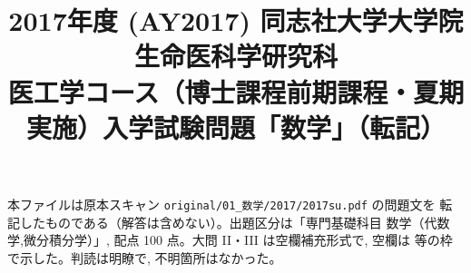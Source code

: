 \documentclass[11pt,a4paper]{article}
\title{2017年度 (AY2017) 同志社大学大学院 生命医科学研究科\\
医工学コース（博士課程前期課程・夏期実施）入学試験問題「数学」（転記）}
\author{}
\date{}
\begin{document}
\maketitle
\vspace{-3em}

\begin{rem}
本ファイルは原本スキャン \texttt{original/01\_数学/2017/2017su.pdf} の問題文を
転記したものである（解答は含めない）。出題区分は「専門基礎科目 数学（代数学,微分積分学）」,
配点 100 点。大問 II・III は空欄補充形式で, 空欄は  等の枠で示した。判読は明瞭で,
不明箇所はなかった。
\end{rem}

\bigskip

\bigskip

\bigskip

\bigskip

\bigskip

\bigskip

\end{document}

